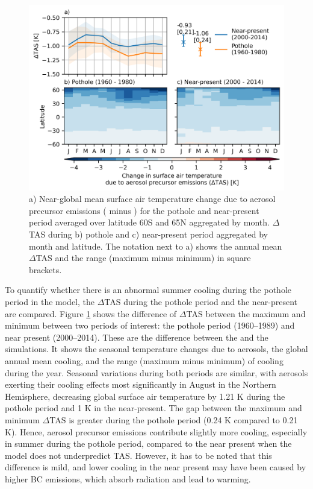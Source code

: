 \begin{figure}
    \centering
    \includegraphics{Chapter4/Figs/tas_range.png}
    \caption[Change in surface air temperature due to aerosol precursor emissions for 1960--1989 and 2000-2014]{a) Near-global mean surface air temperature change due to aerosol precursor emissions (\hist{} minus \histpiaer{}) for the pothole and near-present period averaged over latitude 60\textdegree S and 65\textdegree N aggregated by month. $\Delta$TAS during b) pothole and c) near-present period aggregated by month and latitude. The notation next to a) shows the annual mean $\Delta$TAS and the range (maximum minus minimum) in square brackets.}
    \label{fig:ch4:tas-range}
\end{figure}


To quantify whether there is an abnormal summer cooling during the pothole period in the model, the $\Delta$TAS during the pothole period and the near-present are compared. Figure \ref{fig:ch4:tas-range} shows the difference of $\Delta$TAS between the maximum and minimum between two periods of interest: the pothole period (1960--1989) and near present (2000--2014). These are the difference between the \hist{} and the \histpiaer{} simulations. It shows the seasonal temperature changes due to aerosols, the global annual mean cooling, and the range (maximum minus minimum) of cooling during the year. Seasonal variations during both periods are similar, with aerosols exerting their cooling effects most significantly in August in the Northern Hemisphere, decreasing global surface air temperature by 1.21 K during the pothole period and 1 K in the near-present. The gap between the maximum and minimum $\Delta$TAS is greater during the pothole period (0.24 K compared to 0.21 K). Hence, aerosol precursor emissions contribute slightly more cooling, especially in summer during the pothole period, compared to the near present when the model does not underpredict TAS. However, it has to be noted that this difference is mild, and lower cooling in the near present may have been caused by higher BC emissions, which absorb radiation and lead to warming.

